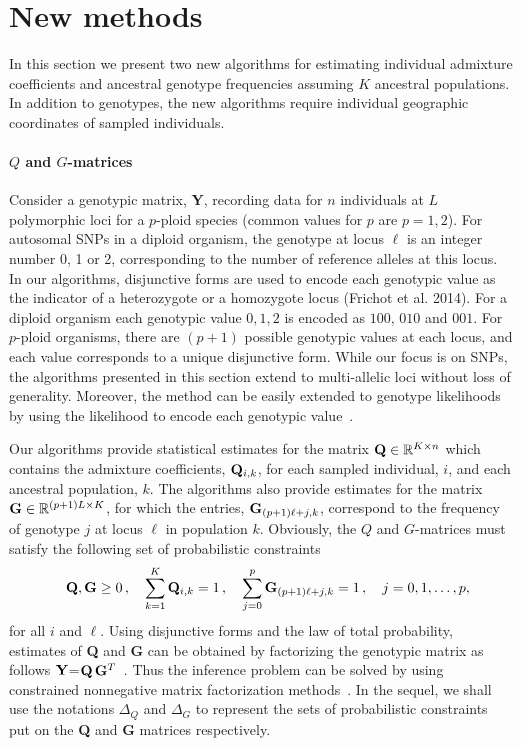 \clearpage
\newpage

\section{New methods}


In this section we present two new algorithms for estimating individual admixture coefficients and ancestral genotype frequencies assuming $K$ ancestral populations. In addition to genotypes, the new algorithms require individual geographic coordinates of sampled individuals.

\paragraph{$Q$ and $G$-matrices} Consider a genotypic matrix, {\bf Y}, recording data for $n$ individuals at $L$ polymorphic loci for a $p$-ploid species (common values for $p$ are $p = 1,2$). For autosomal SNPs in a diploid organism, the genotype at locus $\ell$  is an integer number 0, 1 or 2, corresponding to the number of reference alleles at this locus. In our algorithms, disjunctive forms are used  to encode each genotypic value as the indicator of a heterozygote or a homozygote locus (Frichot et al. 2014). For a diploid organism each genotypic value $0,1,2$ is encoded as $100$, $010$ and $001$. For $p$-ploid organisms, there are $(p+1)$ possible genotypic values at each locus, and each value corresponds to a unique disjunctive form. While our focus is on SNPs, the algorithms presented in this section extend to multi-allelic loci without loss of generality. 
Moreover, the method can be easily extended to genotype likelihoods by using the likelihood to encode each genotypic value~\citep{Korneliussen2014}.

Our algorithms provide statistical estimates for the matrix ${\bf Q} \in \mathbb{R}^{K \times n}$ which contains the admixture coefficients, ${\bf Q}_{i,k}$, for each sampled individual, $i$, and each ancestral population, $k$. The algorithms also provide estimates for the matrix ${\bf G} \in \mathbb{R}^{(p+1)L \times K}$, for which the entries, ${\bf G}_{(p+1)\ell + j, k}$, correspond to the frequency of genotype $j$ at locus $\ell$ in population $k$. Obviously, the $Q$ and $G$-matrices must satisfy the following set of probabilistic constraints 
$$
\quad {\bf Q},{\bf G} \geq 0 \, , \quad  \sum_{k=1}^K {\bf Q}_{i,k} = 1 \, , \quad \sum_{j=0}^p {\bf G}_{(p+1)\ell + j, k} = 1 \, , \quad j = 0,1,\dots, p,
$$
for all $i$ and $\ell$. Using disjunctive forms and the law of total probability, estimates of {\bf Q} and {\bf G} can be obtained by factorizing the genotypic matrix as follows ${\bf Y}$=${\bf Q}\,{\bf G}^T$~\citep{Frichot2014}. Thus the inference problem can be solved by using constrained nonnegative matrix factorization methods~\citep{Lee1999, Cichocki2009}. In the sequel, we shall use the notations  $\Delta_Q$ and $\Delta_G$ to represent the sets of probabilistic constraints put on the {\bf Q} and {\bf G} matrices respectively. 


